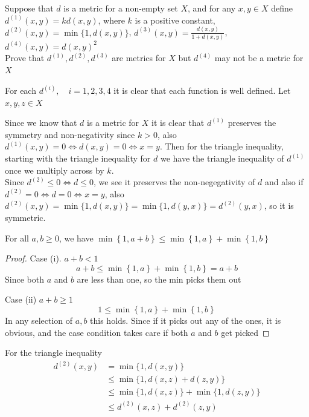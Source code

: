 \documentclass{article}
\begin{document}
\begin{problem}
Suppose that \( d \) is a metric for a non-empty set \( X \), and for any \( x,y \in X \) define
\\
\( d^{(1)}(x,y) = kd(x,y) \), where \( k \) is a positive constant, \( d^{(2)}(x,y) = \min\{1,d(x,y)\} \), \( d^{(3)}(x,y) = \frac{d(x,y)}{1 + d(x,y)} \), \( d^{(4)}(x,y) = d(x,y)^2 \)
\\
Prove that \( d^{(1)}, d^{(2)}, d^{(3)} \) are metrics for \( X \) but \( d^{(4)} \) may not be a metric for \( X \)
\\

\begin{solution}
	For each \( d^{(i)}, \quad i = 1,2,3,4 \) it is clear that each function is well defined.
	Let \( x,y,z \in X \)

	Since we know that \( d \) is a metric for \( X \) it is clear that \( d^{(1)} \) preserves the symmetry and non-negativity since \( k > 0 \), also \( d^{(1)}(x,y) = 0 \iff d(x,y) = 0 \iff x = y \). Then for the triangle inequality, starting with the triangle inequality for \( d \) we have the triangle inequality of \( d^{(1)} \) once we multiply across by \( k \).
	\\

	Since \( d^{(2)} \le 0 \iff d \le  0 \), we see it preserves the non-negegativity of \( d \) and also if \( d^{(2)} = 0 \iff d = 0 \iff x=y \), also \( d^{(2)}(x,y) = \min\{1,d(x,y)\} = \min\{1, d(y,x)\} = d^{(2)}(y,x) \), so it is symmetric.

	\begin{lemma}
		For all \( a, b \ge 0\), we have \( \min\left\{ 1, a + b \right\} \le \min\left\{ 1,a \right\} + \min\left\{ 1, b \right\}  \)
	\end{lemma}
	\begin{proof}
		Case (i). \( a + b < 1 \)
		\[
			a + b \le \min\left\{ 1, a \right\} + \min\left\{ 1,b \right\} = a + b
		\]
		Since both \( a \) and \( b \) are less than one, so the min picks them out

		Case (ii) \( a + b \ge 1 \)
		\[
			1 \le \min\left\{ 1 , a \right\} + \min\left\{ 1,b \right\}
		\]
		In any selection of \( a,b \) this holds. Since if it picks out any of the ones, it is obvious, and the case condition takes care if both \( a \) and \( b \) get picked
	\end{proof}

	For the triangle inequality
	\begin{align*}
		d^{(2)}(x,y) & = \min\{1, d(x,y)\}                      \\
		             & \le \min\{1,d(x,z) + d(z,y)\}            \\
		             & \le \min\{1, d(x,z)\} + \min\{1,d(z,y)\} \\
		             & \le d^{(2)}(x,z) + d^{(2)}(z,y)
	\end{align*}


\end{solution}
\end{problem}
\end{document}
